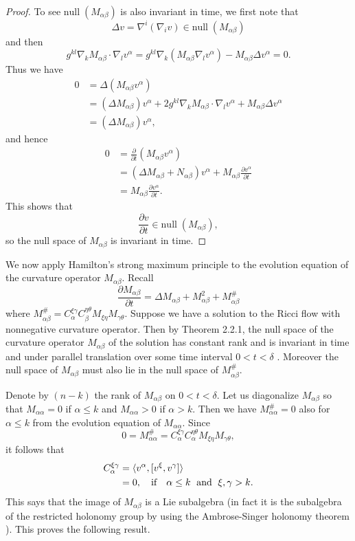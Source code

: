 \begin{proof}
To see $\text{null}\; (M_{\alpha\beta})$ is also invariant in
time, we first note that
$$
\Delta v=\nabla^i(\nabla_i v)\in \text{null}\; (M_{\alpha\beta})
$$
and then
$$
g^{kl}\nabla_kM_{\alpha\beta}\cdot\nabla_lv^\alpha
=g^{kl}\nabla_k(M_{\alpha\beta}\nabla_lv^\alpha)
-M_{\alpha\beta}\Delta v^\alpha=0.
$$
Thus we have
\begin{align*}
0& = \Delta(M_{\alpha\beta}v^\alpha)\\
& = (\Delta M_{\alpha\beta})v^\alpha
+2g^{kl}\nabla_kM_{\alpha\beta}\cdot \nabla_lv^\alpha
+M_{\alpha\beta}\Delta v^\alpha\\
&  = (\Delta M_{\alpha\beta})v^\alpha,
\end{align*}
and hence
\begin{align*}
0&  = \frac{\partial}{\partial t}(M_{\alpha\beta}v^\alpha)\\
&  = (\Delta M_{\alpha\beta}+N_{\alpha\beta})v^\alpha
+M_{\alpha\beta}\frac{\partial v^\alpha}{\partial t}\\
&  = M_{\alpha\beta}\frac{\partial v^\alpha}{\partial t}.
\end{align*}
This shows that
$$
\frac{\partial v}{\partial t}\in \text{null}\; (M_{\alpha\beta}),
$$
so the null space of $M_{\alpha\beta}$ is invariant in time.
\end{proof}

We now apply Hamilton's strong maximum principle to the evolution
equation of the curvature operator $M_{\alpha\beta}$. Recall
$$
\frac{\partial M_{\alpha\beta}}{\partial t} =\Delta
M_{\alpha\beta}+M_{\alpha\beta}^2+M_{\alpha\beta}^{\#}
$$
where $M_{\alpha\beta}^{\#}
=C_\alpha^{\xi\gamma}C_\beta^{\eta\theta}M_{\xi\eta}M_{\gamma\theta}$.
Suppose we have a solution to the Ricci flow with nonnegative
curvature operator. Then by Theorem 2.2.1, the null space of the
curvature operator $M_{\alpha\beta}$ of the solution has constant
rank and is invariant in time and under parallel translation over
some time interval $0<t<\delta$ . Moreover the null space of
$M_{\alpha\beta}$ must also lie in the null space of
$M_{\alpha\beta}^\#$.

Denote by $(n-k)$ the rank of $M_{\alpha\beta}$ on $0<t<\delta$.
Let us diagonalize $M_{\alpha\beta}$ so that $M_{\alpha\alpha}=0$
if $\alpha\le k$ and $M_{\alpha\alpha}>0$ if $\alpha>k$. Then we
have $M_{\alpha\alpha}^\#=0$ also for $\alpha\le k$ from the
evolution equation of $M_{\alpha\alpha}$. Since
$$
0=M_{\alpha\alpha}^\#
=C_\alpha^{\xi\gamma}C_\alpha^{\eta\theta}M_{\xi\eta}M_{\gamma\theta},
$$
it follows that
\begin{align*}
C_\alpha^{\xi\gamma}&  = \langle v^\alpha,[v^\xi,v^\gamma]\rangle\\
&  = 0, \quad \text{if}\quad \alpha\le k\; \text{ and }\;
\xi,\gamma> k.
\end{align*}
This says that the image of $M_{\alpha\beta}$ is a Lie subalgebra
(in fact it is the subalgebra of the restricted holonomy group by
using the Ambrose-Singer holonomy theorem \cite{As53}). This
proves the following result.

